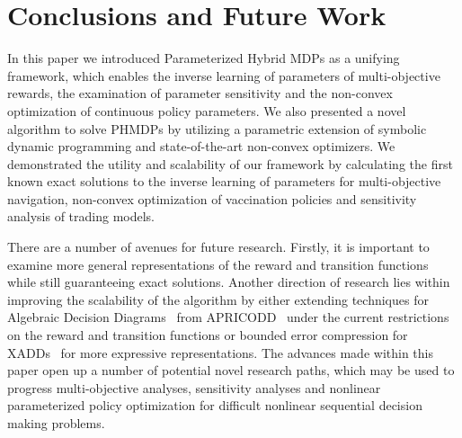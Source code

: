 \section{Conclusions and Future Work}
\label{sec:conclusion}

In this paper we introduced Parameterized Hybrid MDPs as a unifying framework, which enables the inverse learning of parameters of multi-objective rewards, the examination of parameter sensitivity and the non-convex optimization of continuous policy parameters. We also presented a novel algorithm to solve PHMDPs by utilizing a parametric extension of symbolic dynamic programming and state-of-the-art non-convex optimizers. We demonstrated the utility and scalability of our framework by calculating the first known exact solutions to the inverse learning of parameters for multi-objective navigation, non-convex optimization of vaccination policies and sensitivity analysis of trading models.

There are a number of avenues for future research. Firstly, it is important to examine more general representations of the reward and transition functions while still guaranteeing exact solutions. Another direction of research lies within improving the scalability of the algorithm by either extending techniques for Algebraic Decision Diagrams~\parencite{Bahar_JoFMiSD_1993} from APRICODD~\parencite{St-Aubin_NIPS_2000} under the current restrictions on the reward and transition functions or bounded error compression for XADDs~\parencite{Vianna_UAI_2013} for more expressive representations. The advances made within this paper open up a number of potential novel research paths, which may be used to progress multi-objective analyses, sensitivity analyses and nonlinear parameterized policy optimization for difficult nonlinear sequential decision making problems.
